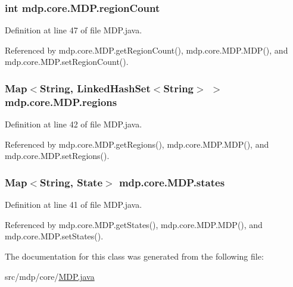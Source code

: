 \hypertarget{classmdp_1_1core_1_1_m_d_p_ae2644b9387e09a5c2ab096c0bb519f8d}{}
\subsubsection[{region\+Count}]{\setlength{\rightskip}{0pt plus 5cm}int mdp.\+core.\+M\+D\+P.\+region\+Count\hspace{0.3cm}{\ttfamily [private]}}\label{classmdp_1_1core_1_1_m_d_p_ae2644b9387e09a5c2ab096c0bb519f8d}


Definition at line 47 of file M\+D\+P.\+java.



Referenced by mdp.\+core.\+M\+D\+P.\+get\+Region\+Count(), mdp.\+core.\+M\+D\+P.\+M\+D\+P(), and mdp.\+core.\+M\+D\+P.\+set\+Region\+Count().

\hypertarget{classmdp_1_1core_1_1_m_d_p_a79761e7b3bb0d7a083bee7183c992893}{}
\subsubsection[{regions}]{\setlength{\rightskip}{0pt plus 5cm}Map$<$String, Linked\+Hash\+Set$<$String$>$ $>$ mdp.\+core.\+M\+D\+P.\+regions\hspace{0.3cm}{\ttfamily [private]}}\label{classmdp_1_1core_1_1_m_d_p_a79761e7b3bb0d7a083bee7183c992893}


Definition at line 42 of file M\+D\+P.\+java.



Referenced by mdp.\+core.\+M\+D\+P.\+get\+Regions(), mdp.\+core.\+M\+D\+P.\+M\+D\+P(), and mdp.\+core.\+M\+D\+P.\+set\+Regions().

\hypertarget{classmdp_1_1core_1_1_m_d_p_a62bf7674d88162db7d00cfd82603b24f}{}
\subsubsection[{states}]{\setlength{\rightskip}{0pt plus 5cm}Map$<$String, {\bf State}$>$ mdp.\+core.\+M\+D\+P.\+states\hspace{0.3cm}{\ttfamily [private]}}\label{classmdp_1_1core_1_1_m_d_p_a62bf7674d88162db7d00cfd82603b24f}


Definition at line 41 of file M\+D\+P.\+java.



Referenced by mdp.\+core.\+M\+D\+P.\+get\+States(), mdp.\+core.\+M\+D\+P.\+M\+D\+P(), and mdp.\+core.\+M\+D\+P.\+set\+States().



The documentation for this class was generated from the following file\+:\begin{DoxyCompactItemize}
\item 
src/mdp/core/\hyperlink{_m_d_p_8java}{M\+D\+P.\+java}\end{DoxyCompactItemize}
